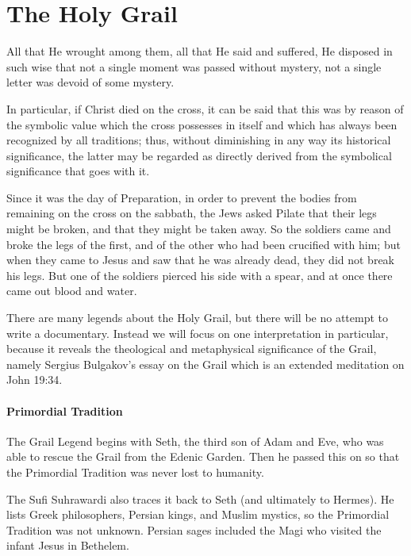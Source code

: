 \section{The Holy Grail}

\begin{quotex}
All that He wrought among them, all that He said and suffered, He disposed in such wise that not a single moment was passed without mystery, not a single letter was devoid of some mystery. 

In particular, if Christ died on the cross, it can be said that this was by reason of the symbolic value which the cross possesses in itself and which has always been recognized by all traditions; thus, without diminishing in any way its historical significance, the latter may be regarded as directly derived from the symbolical significance that goes with it. 

Since it was the day of Preparation, in order to prevent the bodies from remaining on the cross on the sabbath, the Jews asked Pilate that their legs might be broken, and that they might be taken away. So the soldiers came and broke the legs of the first, and of the other who had been crucified with him; but when they came to Jesus and saw that he was already dead, they did not break his legs. But one of the soldiers pierced his side with a spear, and at once there came out blood and water. 

\end{quotex}
There are many legends about the Holy Grail, but there will be no attempt to write a documentary. Instead we will focus on one interpretation in particular, because it reveals the theological and metaphysical significance of the Grail, namely Sergius Bulgakov's essay on the Grail which is an extended meditation on John 19:34.

\paragraph{Primordial Tradition}

The Grail Legend begins with Seth, the third son of Adam and Eve, who was able to rescue the Grail from the Edenic Garden. Then he passed this on so that the Primordial Tradition was never lost to humanity.

The Sufi Suhrawardi also traces it back to Seth (and ultimately to Hermes). He lists Greek philosophers, Persian kings, and Muslim mystics, so the Primordial Tradition was not unknown. Persian sages included the Magi who visited the infant Jesus in Bethelem.

